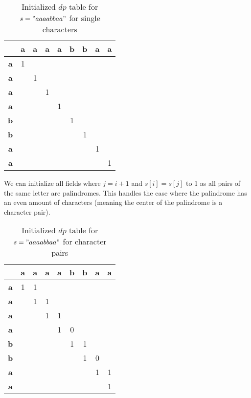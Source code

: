 \begin{table}[htbp]
    \centering
    \begin{tabular}{|c|c|c|c|c|c|c|c|c|}
        \hline
          & \textbf{a} & \textbf{a} & \textbf{a} & \textbf{a} & \textbf{b} & \textbf{b} & \textbf{a} & \textbf{a} \\
        \hline
        \textbf{a} & 1 &  &  &  &  &  &  &  \\
        \hline
        \textbf{a} &  & 1 &  &  &  &  &  &  \\
        \hline
        \textbf{a} &  &  & 1 &  &  &  &  &  \\
        \hline
        \textbf{a} &  &  &  & 1 &  &  &  &  \\
        \hline
        \textbf{b} &  &  &  &  & 1 &  &  &  \\
        \hline
        \textbf{b} &  &  &  &  &  & 1 &  &  \\
        \hline
        \textbf{a} &  &  &  &  &  &  & 1 &  \\
        \hline
        \textbf{a} &  &  &  &  &  &  &  & 1 \\
        \hline
    \end{tabular}
    \caption{Initialized $dp$ table for $s="aaaabbaa"$ for single characters}
\end{table}

We can initialize all fields where $j = i+1$ and $s[i] = s[j]$ to 1 as all pairs of the same letter are palindromes.
This handles the case where the palindrome has an even amount of characters (meaning the center of the palindrome is a character pair).


\begin{table}[htbp]
    \centering
    \begin{tabular}{|c|c|c|c|c|c|c|c|c|}
        \hline
          & \textbf{a} & \textbf{a} & \textbf{a} & \textbf{a} & \textbf{b} & \textbf{b} & \textbf{a} & \textbf{a} \\
        \hline
        \textbf{a} & 1 & 1 &  &  &  &  &  &  \\
        \hline
        \textbf{a} &  & 1 & 1 &  &  &  &  &  \\
        \hline
        \textbf{a} &  &  & 1 & 1 &  &  &  &  \\
        \hline
        \textbf{a} &  &  &  & 1 & 0 &  &  &  \\
        \hline
        \textbf{b} &  &  &  &  & 1 & 1 &  &  \\
        \hline
        \textbf{b} &  &  &  &  &  & 1 & 0 &  \\
        \hline
        \textbf{a} &  &  &  &  &  &  & 1 & 1 \\
        \hline
        \textbf{a} &  &  &  &  &  &  &  & 1 \\
        \hline
    \end{tabular}
    \caption{Initialized $dp$ table for $s="aaaabbaa"$ for character pairs}
\end{table}

